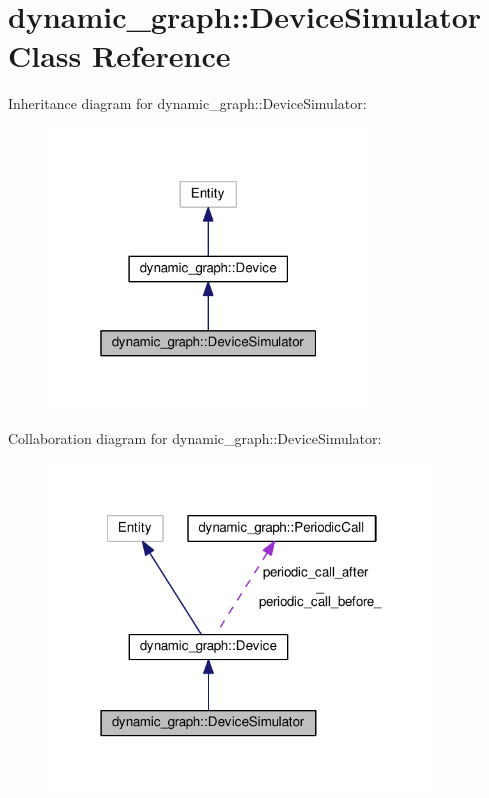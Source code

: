 \hypertarget{classdynamic__graph_1_1DeviceSimulator}{}\section{dynamic\+\_\+graph\+:\+:Device\+Simulator Class Reference}
\label{classdynamic__graph_1_1DeviceSimulator}


Inheritance diagram for dynamic\+\_\+graph\+:\+:Device\+Simulator\+:\nopagebreak
\begin{figure}[H]
\begin{center}
\leavevmode
\includegraphics[width=241pt]{classdynamic__graph_1_1DeviceSimulator__inherit__graph}
\end{center}
\end{figure}


Collaboration diagram for dynamic\+\_\+graph\+:\+:Device\+Simulator\+:\nopagebreak
\begin{figure}[H]
\begin{center}
\leavevmode
\includegraphics[width=291pt]{classdynamic__graph_1_1DeviceSimulator__coll__graph}
\end{center}
\end{figure}
